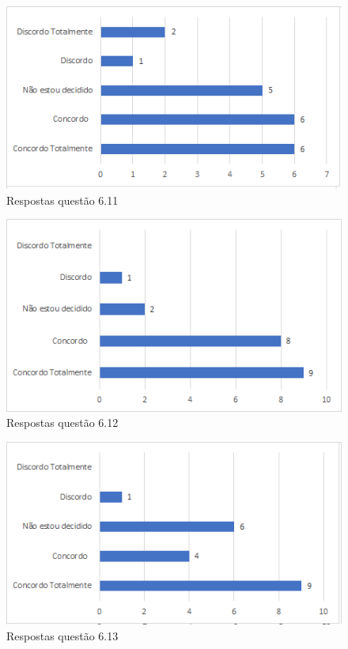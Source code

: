 \begin{figure}[!t]
\centering
\includegraphics[scale=0.7]{figuras das questoes/6.11.png}
\caption{Respostas questão 6.11}
\end{figure}

\begin{figure}[!t]
\centering
\includegraphics[scale=0.7]{figuras das questoes/6.12.png}
\caption{Respostas questão 6.12}
\end{figure}

\begin{figure}[!t]
\centering
\includegraphics[scale=0.7]{figuras das questoes/6.13.png}
\caption{Respostas questão 6.13}
\end{figure}


